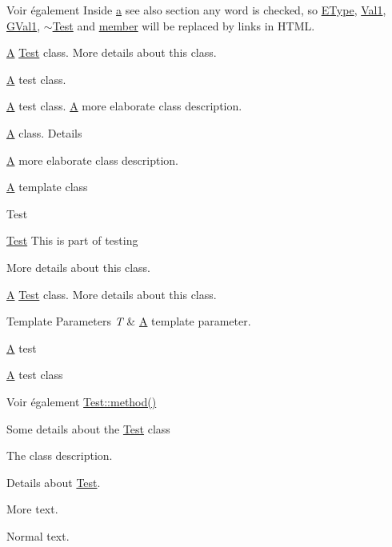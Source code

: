 \begin{DoxySeeAlso}{Voir également}
Inside \hyperlink{060__command__switch_8tcl_ab08ae027fc5777bc4f0629f1b60b35db}{a} see also section any word is checked, so \hyperlink{class_test_a0653c5125502203305b6fe839e99ed01}{E\+Type}, \hyperlink{class_test_ad8d13fe56b896633273087859b89a1a3af621232782128e49458adf9069e126d4}{Val1}, \hyperlink{autolink_8cpp_a656d63cf384d2a6f23c2c18523a7bc5ea0f016f49e4f3bcd072319b9d68bc927d}{G\+Val1}, \hyperlink{class_test_a31b169208ad4fc5344a7b6b8e1fd00c1}{$\sim$\+Test} and \hyperlink{class_test_a703997077e40c222687a0ea2973a9ea1}{member} will be replaced by links in H\+T\+M\+L.
\end{DoxySeeAlso}
\hyperlink{class_a}{A} \hyperlink{class_test}{Test} class. More details about this class.

\hyperlink{class_a}{A} test class.

\hyperlink{class_a}{A} test class. \hyperlink{class_a}{A} more elaborate class description.

\hyperlink{class_a}{A} class. Details

\hyperlink{class_a}{A} more elaborate class description.

\hyperlink{class_a}{A} template class

\begin{DoxyRefDesc}{Test}
\item[\hyperlink{test__test000001}{Test}]This is part of testing \end{DoxyRefDesc}


More details about this class.

\hyperlink{class_a}{A} \hyperlink{class_test}{Test} class. More details about this class. 
\begin{DoxyTemplParams}{Template Parameters}
{\em T} & \hyperlink{class_a}{A} template parameter.\\
\hline
\end{DoxyTemplParams}
\hyperlink{class_a}{A} test

\hyperlink{class_a}{A} test class \begin{DoxySeeAlso}{Voir également}
\hyperlink{class_test_a2a91524f180391310e4e2735599b3f18}{Test\+::method()}
\end{DoxySeeAlso}
Some details about the \hyperlink{class_test}{Test} class

The class description.

Details about \hyperlink{class_test}{Test}.

More text.

Normal text.


